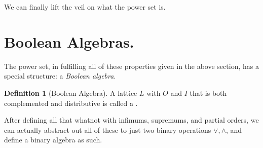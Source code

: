 \documentclass[10pt, letterpaper]{article}
\theoremstyle{definition}
\newtheorem{definition}{Definition}[section]
\begin{document}
We can finally lift the veil on what the power set is.

\section{Boolean Algebras.}

The power set, in fulfilling all of these properties given in the above section,
has a special structure: a \textit{Boolean algebra}.

\begin{definition}[Boolean Algebra]
	A lattice \(L\) with \(O\) and \(I\) that is both complemented and distributive
	is called a .
\end{definition}

After defining all that whatnot with infimums, supremums, and partial orders,
we can actually abstract out all of these to just two binary operations
\(\vee, \wedge\), and define a binary algebra as such.
\end{document}
